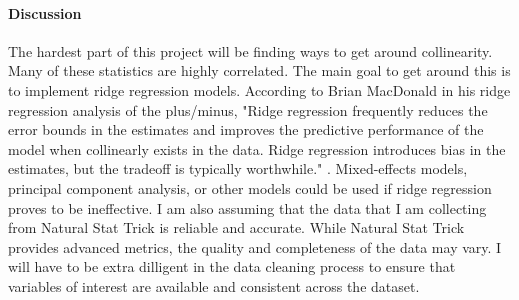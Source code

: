 \documentclass[12pt]{article}
\begin{document}
\paragraph{Discussion}
The hardest part of this project will be finding ways to get around collinearity. Many of these statistics are highly correlated.
The main goal to get around this is to implement ridge regression models. According to Brian MacDonald in his ridge regression analysis 
of the plus/minus, "Ridge regression frequently reduces the error bounds in the estimates and improves the predictive performance 
of the model when collinearly exists in the data. Ridge regression introduces bias in the estimates, but the tradeoff is typically 
worthwhile." \cite{Macdonald_2012}. Mixed-effects models, principal component analysis, or other models could be used if ridge regression 
proves to be ineffective. I am also assuming that the data that I am collecting from Natural Stat Trick is reliable and accurate. While 
Natural Stat Trick provides advanced metrics, the quality and completeness of the data may vary. I will have to be extra dilligent in 
the data cleaning process to ensure that variables of interest are available and consistent across the dataset.



\end{document}
